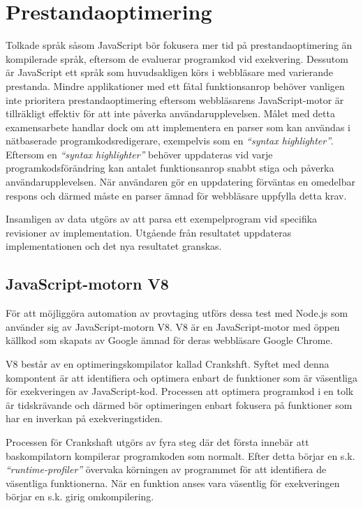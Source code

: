 \section{Prestandaoptimering}

Tolkade språk såsom JavaScript bör fokusera mer tid på prestandaoptimering än
kompilerade språk, eftersom de evaluerar programkod vid exekvering. Dessutom är
JavaScript ett språk som huvudsakligen körs i webbläsare med varierande
prestanda. Mindre applikationer med ett fåtal funktionsanrop behöver vanligen
inte prioritera prestandaoptimering eftersom webbläsarens JavaScript-motor är
tillräkligt effektiv för att inte påverka användarupplevelsen. Målet med detta
examensarbete handlar dock om att implementera en parser som kan användas i
nätbaserade programkodsredigerare, exempelvis som en \textit{``syntax
highlighter''}. Eftersom en \textit{``syntax highlighter''} behöver
uppdateras vid varje programkodsförändring kan antalet funktionsanrop snabbt
stiga och påverka användarupplevelsen. När användaren gör en uppdatering
förväntas en omedelbar respons och därmed måste en parser ämnad för webbläsare
uppfylla detta krav.

Insamligen av data utgörs av att parsa ett exempelprogram vid specifika
revisioner av implementation. Utgående från resultatet uppdateras
implementationen och det nya resultatet granskas.

\subsection{JavaScript-motorn V8}

För att möjliggöra automation av provtaging utförs dessa test med Node.js
som använder sig av JavaScript-motorn V8. V8 är en JavaScript-motor med öppen
källkod som skapats av Google ämnad för deras webbläsare Google Chrome.

V8 består av en optimeringskompilator kallad Crankshft. Syftet med denna
kompontent är att identifiera och optimera enbart de funktioner som är
väsentliga för exekveringen av JavaScript-kod. Processen att optimera
programkod i en tolk är tidskrävande och därmed bör optimeringen enbart
fokusera på funktioner som har en inverkan på exekveringstiden.

Processen för Crankshaft utgörs av fyra steg där det första innebär att
baskompilatorn kompilerar programkoden som normalt. Efter detta börjar en s.k.
\textit{``runtime-profiler''} övervaka körningen av programmet för att
identifiera de väsentliga funktionerna. När en funktion anses vara väsentlig
för exekveringen börjar en s.k. girig omkompilering.

